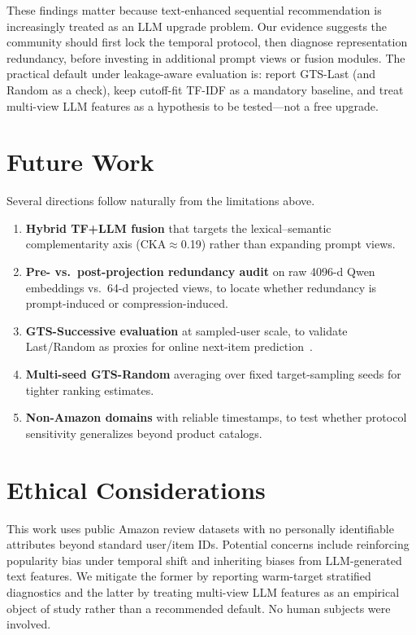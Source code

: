 \documentclass[sigconf,natbib=true,anonymous]{acmart}
\newcommand{\tfidf}{\textsc{TF-IDF}\xspace}
\begin{document}
These findings matter because text-enhanced sequential recommendation is increasingly treated as an LLM upgrade problem.
Our evidence suggests the community should first lock the temporal protocol, then diagnose representation redundancy, before investing in additional prompt views or fusion modules.
The practical default under leakage-aware evaluation is: report GTS-Last (and Random as a check), keep cutoff-fit \tfidf as a mandatory baseline, and treat multi-view LLM features as a hypothesis to be tested---not a free upgrade.

\section{Future Work}
\label{sec:future}

Several directions follow naturally from the limitations above.
\begin{enumerate}[leftmargin=*,itemsep=1pt]
\item \textbf{Hybrid TF+LLM fusion} that targets the lexical--semantic complementarity axis (CKA$\approx$0.19) rather than expanding prompt views.
\item \textbf{Pre- vs.\ post-projection redundancy audit} on raw 4096-d Qwen embeddings vs.\ 64-d projected views, to locate whether redundancy is prompt-induced or compression-induced.
\item \textbf{GTS-Successive evaluation} at sampled-user scale, to validate Last/Random as proxies for online next-item prediction~\cite{liang2024timetosplit}.
\item \textbf{Multi-seed GTS-Random} averaging over fixed target-sampling seeds for tighter ranking estimates.
\item \textbf{Non-Amazon domains} with reliable timestamps, to test whether protocol sensitivity generalizes beyond product catalogs.
\end{enumerate}

\section*{Ethical Considerations}
This work uses public Amazon review datasets with no personally identifiable attributes beyond standard user/item IDs.
Potential concerns include reinforcing popularity bias under temporal shift and inheriting biases from LLM-generated text features.
We mitigate the former by reporting warm-target stratified diagnostics and the latter by treating multi-view LLM features as an empirical object of study rather than a recommended default.
No human subjects were involved.
\end{document}
